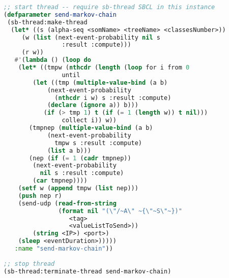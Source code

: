  \smallskip
 
 \begin{lstlisting}[basicstyle=\footnotesize\ttfamily,language=Lisp]
;; start thread -- require sb-thread SBCL in this instance
(defparameter send-markov-chain
 (sb-thread:make-thread
  (let* ((s (alpha-seq <somName> <treeName> <classesNumber>))
	 (w (list (next-event-probability nil s 
	            :result :compute)))
	 (r w))
   #'(lambda () (loop do
    (let* ((tmpw (nthcdr (length (loop for i from 0
				until
		(let ((tmp (multiple-value-bind (a b)
			(next-event-probability 
			  (nthcdr i w) s :result :compute) 
			(declare (ignore a)) b)))
		   (if (> tmp 1) t (if (= 1 (length w)) t nil)))
				collect i)) w))
       (tmpnep (multiple-value-bind (a b)
	        (next-event-probability 
	          tmpw s :result :compute) 
	        (list a b)))
       (nep (if (= 1 (cadr tmpnep))
		(next-event-probability
		  nil s :result :compute)
		(car tmpnep))))
	(setf w (append tmpw (list nep)))
	(push nep r)
	(send-udp (read-from-string 
               (format nil "(\"/~A\" ~{\"~S\"~})"
                  <tag>
                  <valueListToSend>)) 
	    (string <IP>) <port>)
	(sleep <eventDuration>)))))
   :name "send-markov-chain"))
   
;; stop thread
(sb-thread:terminate-thread send-markov-chain)
\end{lstlisting}